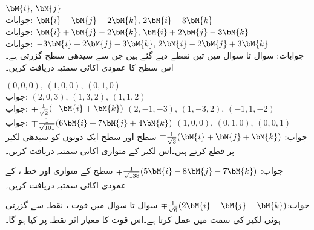 \quad
$\bM{i},\,\bM{j}$\\
جوابات:
\quad
$\bM{i}-\bM{j}+2\bM{k},\, 2\bM{i}+3\bM{k}$\\
جوابات:
\quad
$\bM{i}+\bM{j}-2\bM{k},\,\bM{i}+2\bM{j}-3\bM{k}$\\
جوابات:
\quad
$-3\bM{i}+2\bM{j}-3\bM{k},\,2\bM{i}-2\bM{j}+3\bM{k}$\\
جوابات:
سوال  تا سوال  میں تین نقطے دیے گئے ہیں جن سے سیدھی سطح گزرتی ہے۔اس سطح کا عمودی اکائی سمتیہ دریافت کریں۔

\quad
$(0,0,0),\, (1,0,0),\, (0,1,0)$\\
جواب:
\quad
$(2,0,3),\, (1,3,2),\, (1,1,2)$\\
جواب:
$\mp\tfrac{1}{\sqrt{2}}(-\bM{i}+\bM{k})$
\quad
$(2,-1,-3),\, (1,-3,2),\, (-1,1,-2)$\\
جواب:
$\mp\tfrac{1}{\sqrt{101}}(6\bM{i}+7\bM{j}+4\bM{k})$
\quad
$(1,0,0),\, (0,1,0),\, (0,0,1)$\\
جواب:
$\mp\tfrac{1}{\sqrt{3}}(\bM{i}+\bM{j}+\bM{k})$
سطح  اور سطح  ایک دونوں کو سیدھی لکیر پر قطع کرتے ہیں۔اس لکیر کے متوازی اکائی سمتیہ دریافت کریں۔

جواب:
$\mp\tfrac{1}{\sqrt{138}}(5\bM{i}-8\bM{j}-7\bM{k})$
سطح  کے متوازی اور خط ،  کے عمودی اکائی سمتیہ دریافت کریں۔

جواب:$\mp\tfrac{1}{\sqrt{6}}(2\bM{i}-\bM{j}-\bM{k})$
سوال  تا سوال  میں قوت ، نقطہ  سے گزرتی ہوئی لکیر کی سمت میں عمل کرتا ہے۔اس قوت کا معیار اثر   نقطہ  پر کیا ہو گا۔

